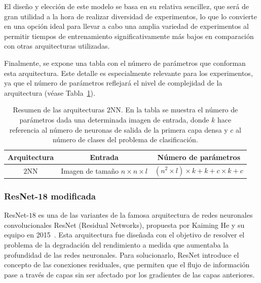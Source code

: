 El diseño y elección de este modelo se basa en su relativa sencillez, que será de gran utilidad a la hora de realizar diversidad de experimentos, lo que lo convierte en una opción ideal para llevar a cabo una amplia variedad de experimentos al permitir tiempos de entrenamiento significativamente más bajos en comparación con otras arquitecturas utilizadas.\newline

Finalmente, se expone una tabla con el número de parámetros que conforman esta arquitectura. Este detalle es especialmente relevante para los experimentos, ya que el número de parámetros reflejará el nivel de complejidad de la arquitectura (véase Tabla~\ref{tab:numero-parametros}).\newline

\begin{table}[ht]
    \centering
    \renewcommand{\arraystretch}{1.5} 
    \begin{tabular}{|c|c|c|}
    \hline
    \textbf{Arquitectura}          & \textbf{Entrada}                                   & \textbf{Número de parámetros}                     \\ \hline
    $2$NN                & Imagen de tamaño $n \times n \times l$                & $(n^2 \times l) \times k + k + c \times k + c$                                             \\ \hline
    \end{tabular}
    \caption[Resumen de las arquitecturas $2$NN.]{Resumen de las arquitecturas $2$NN. En la tabla se muestra el número de parámetros dada una determinada imagen de entrada, donde $k$ hace referencia al número de neuronas de salida de la primera capa densa y $c$ al número de clases del problema de clasificación.}\label{tab:numero-parametros}
\end{table}

\subsubsection{ResNet-18 modificada}\label{subsubsec:resnet18-modificada}

ResNet-$18$ es una de las variantes de la famosa arquitectura de redes neuronales convolucionales ResNet (Residual Networks), propuesta por Kaiming He y su equipo en 2015~\cite{He2015}. Esta arquitectura fue diseñada con el objetivo de resolver el problema de la degradación del rendimiento a medida que aumentaba la profundidad de las redes neuronales. Para solucionarlo, ResNet introduce el concepto de las conexiones residuales, que permiten que el flujo de información pase a través de capas sin ser afectado por los gradientes de las capas anteriores.\newline

